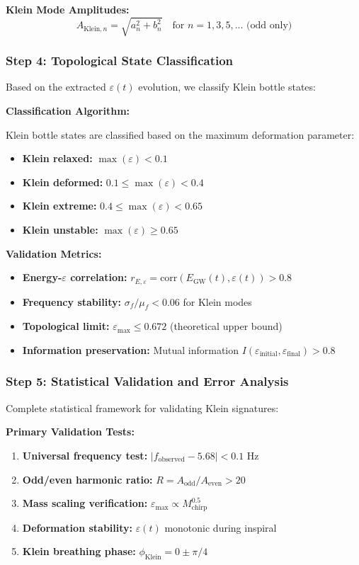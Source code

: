 \documentclass[12pt]{iopart}
\begin{document}
\textbf{Klein Mode Amplitudes:}
\begin{equation}
A_{\text{Klein},n} = \sqrt{a_n^2 + b_n^2} \quad \text{for } n = 1,3,5,... \text{ (odd only)}
\label{eq:klein_amplitudes}
\end{equation}

\subsubsection{Step 4: Topological State Classification}

Based on the extracted $\varepsilon(t)$ evolution, we classify Klein bottle states:

\textbf{Classification Algorithm:}

Klein bottle states are classified based on the maximum deformation parameter:
\begin{itemize}
\item \textbf{Klein relaxed:} $\max(\varepsilon) < 0.1$
\item \textbf{Klein deformed:} $0.1 \leq \max(\varepsilon) < 0.4$ 
\item \textbf{Klein extreme:} $0.4 \leq \max(\varepsilon) < 0.65$
\item \textbf{Klein unstable:} $\max(\varepsilon) \geq 0.65$
\end{itemize}

\textbf{Validation Metrics:}
\begin{itemize}
\item \textbf{Energy-$\varepsilon$ correlation:} $r_{E,\varepsilon} = \text{corr}(E_{\text{GW}}(t), \varepsilon(t)) > 0.8$
\item \textbf{Frequency stability:} $\sigma_f/\mu_f < 0.06$ for Klein modes
\item \textbf{Topological limit:} $\varepsilon_{\max} \leq 0.672$ (theoretical upper bound)
\item \textbf{Information preservation:} Mutual information $I(\varepsilon_{\text{initial}}, \varepsilon_{\text{final}}) > 0.8$
\end{itemize}

\subsubsection{Step 5: Statistical Validation and Error Analysis}

Complete statistical framework for validating Klein signatures:

\textbf{Primary Validation Tests:}
\begin{enumerate}
\item \textbf{Universal frequency test:} $|f_{\text{observed}} - 5.68| < 0.1$ Hz
\item \textbf{Odd/even harmonic ratio:} $R = A_{\text{odd}}/A_{\text{even}} > 20$
\item \textbf{Mass scaling verification:} $\varepsilon_{\max} \propto M_{\text{chirp}}^{0.5}$
\item \textbf{Deformation stability:} $\varepsilon(t)$ monotonic during inspiral
\item \textbf{Klein breathing phase:} $\phi_{\text{Klein}} = 0 \pm \pi/4$
\end{enumerate}
\end{document}
